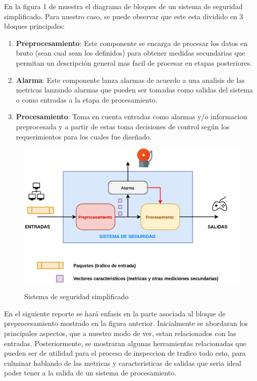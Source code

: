 \documentclass[12pt]{article}
\begin{document}
En la figura 1 de muestra el diagrama de bloques de un sistema de seguridad simplificado. Para nuestro caso, se puede observar que este esta dividido en 3 bloques principales:
\begin{enumerate}
\item \textbf{Preprocesamiento}: Este componente se encarga de procesar los datos en bruto (sean cual sean los definidos) para obtener medidas secundarias que permitan un descripción general mas facil de procesar en etapas posteriores.
\item \textbf{Alarma}: Este componente lanza alarmas de acuerdo a una analisis de las metricas lanzando alarmas que pueden ser tomadas como salidas del sistema o como entradas a la etapa de procesamiento.
\item \textbf{Procesamiento}: Toma en cuenta entradas como alarmas y/o informacion preprocesada y a partir de estas toma decisiones de control según los requerimientos para los cuales fue diseñado. 
\end{enumerate}

\begin{figure}[htbp]
\begin{center}
\includegraphics[scale=0.5]{sistema_simplificado2.png}\\[1cm] %
\caption{Sistema de seguridad simplificado}
\end{center}
\end{figure}

En el siguiente reporte se hará enfasis en la parte asociada al bloque de preprocesamiento mostrado en la figura anterior. Inicialmente se abordaran los principales aspectos, que a nuestro modo de ver, estan relacionados con las entradas. Posteriormente, se mostraran algunas herramientas relacionadas que pueden ser de utilidad para el proceso de inspeccion de trafico todo esto, para culminar hablando de las metricas y caracteristicas de salidas que seria ideal poder tener a la salida de un sistema de procesamiento.
\end{document}
